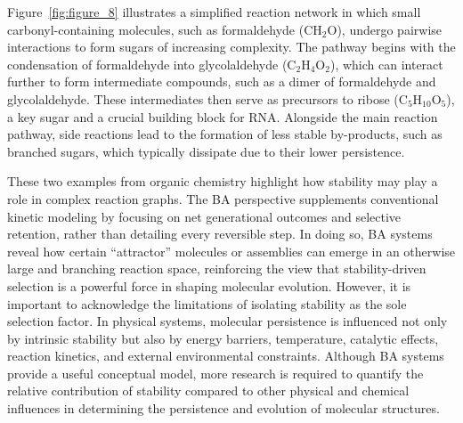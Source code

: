 \documentclass[preprint,12pt]{elsarticle}
\begin{document}
Figure~\ref{fig:figure_8} illustrates a simplified reaction network in which small carbonyl-containing molecules, such as formaldehyde (CH$_2$O), undergo pairwise interactions to form sugars of increasing complexity. The pathway begins with the condensation of formaldehyde into glycolaldehyde (C$_2$H$_4$O$_2$), which can interact further to form intermediate compounds, such as a dimer of formaldehyde and glycolaldehyde. These intermediates then serve as precursors to ribose (C$_5$H$_{10}$O$_5$), a key sugar and a crucial building block for RNA. Alongside the main reaction pathway, side reactions lead to the formation of less stable by-products, such as branched sugars, which typically dissipate due to their lower persistence.

These two examples from organic chemistry highlight how stability may play a role in complex reaction graphs. The BA perspective supplements conventional kinetic modeling by focusing on net generational outcomes and selective retention, rather than detailing every reversible step. In doing so, BA systems reveal how certain ``attractor'' molecules or assemblies can emerge in an otherwise large and branching reaction space, reinforcing the view that stability-driven selection is a powerful force in shaping molecular evolution. However, it is important to acknowledge the limitations of isolating stability as the sole selection factor. In physical systems, molecular persistence is influenced not only by intrinsic stability but also by energy barriers, temperature, catalytic effects, reaction kinetics, and external environmental constraints. Although BA systems provide a useful conceptual model, more research is required to quantify the relative contribution of stability compared to other physical and chemical influences in determining the persistence and evolution of molecular structures.
\end{document}
